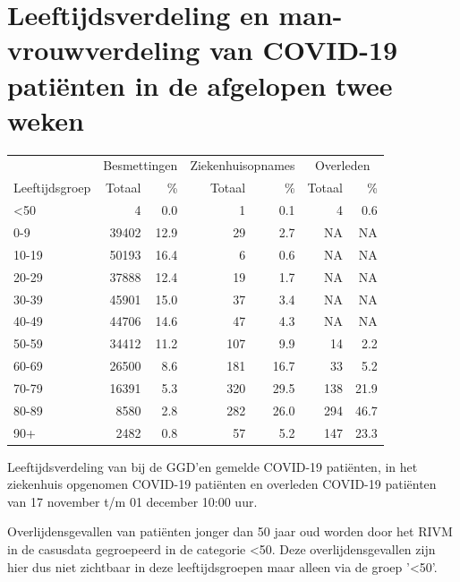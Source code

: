 \documentclass[
  english,
  man,floatsintext]{apa6}
\begin{document}
\hypertarget{leeftijdsverdeling-en-man-vrouwverdeling-van-covid-19-patiuxebnten-in-de-afgelopen-twee-weken}{%
\section{Leeftijdsverdeling en man-vrouwverdeling van COVID-19 patiënten in de afgelopen twee weken}\label{leeftijdsverdeling-en-man-vrouwverdeling-van-covid-19-patiuxebnten-in-de-afgelopen-twee-weken}}

\begin{table}
\centering\begingroup\fontsize{11}{13}\selectfont

\begin{threeparttable}
\begin{tabular}{lrrrrrr}
\toprule
\multicolumn{1}{c}{ } & \multicolumn{2}{c}{Besmettingen} & \multicolumn{2}{c}{Ziekenhuisopnames} & \multicolumn{2}{c}{Overleden} \\
\cmidrule(l{3pt}r{3pt}){2-3} \cmidrule(l{3pt}r{3pt}){4-5} \cmidrule(l{3pt}r{3pt}){6-7}
Leeftijdsgroep & Totaal & \% & Totaal & \% & Totaal & \%\\
\midrule
<50 & 4 & 0.0 & 1 & 0.1 & 4 & 0.6\\
0-9 & 39402 & 12.9 & 29 & 2.7 & NA & NA\\
10-19 & 50193 & 16.4 & 6 & 0.6 & NA & NA\\
20-29 & 37888 & 12.4 & 19 & 1.7 & NA & NA\\
30-39 & 45901 & 15.0 & 37 & 3.4 & NA & NA\\
40-49 & 44706 & 14.6 & 47 & 4.3 & NA & NA\\
50-59 & 34412 & 11.2 & 107 & 9.9 & 14 & 2.2\\
60-69 & 26500 & 8.6 & 181 & 16.7 & 33 & 5.2\\
70-79 & 16391 & 5.3 & 320 & 29.5 & 138 & 21.9\\
80-89 & 8580 & 2.8 & 282 & 26.0 & 294 & 46.7\\
90+ & 2482 & 0.8 & 57 & 5.2 & 147 & 23.3\\
\bottomrule
\end{tabular}
\begin{tablenotes}
\item[1] Leeftijdsverdeling van bij de GGD’en gemelde COVID-19 patiënten, in het ziekenhuis opgenomen COVID-19 patiënten en overleden COVID-19 patiënten van 17 november t/m 01 december 10:00 uur.
\item[2] Overlijdensgevallen van patiënten jonger dan 50 jaar oud worden door het RIVM in de casusdata gegroepeerd in de categorie <50. Deze overlijdensgevallen zijn hier dus niet zichtbaar in deze leeftijdsgroepen maar alleen via de groep '<50'.
\end{tablenotes}
\end{threeparttable}
\endgroup{}
\end{table}
\end{document}
